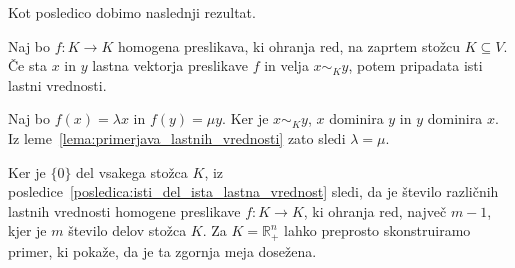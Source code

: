 \documentclass[mat2, tisk]{fmfdelo}
\newcommand{\R}{\mathbb{R}}
\begin{document}
Kot posledico dobimo naslednji rezultat.

\begin{posledica}\label{posledica:isti_del_ista_lastna_vrednost}
Naj bo $f\colon K\longrightarrow K$ homogena preslikava, ki ohranja red,
na zaprtem stožcu $K\subseteq V$. Če sta $x$ in $y$ lastna vektorja
preslikave $f$ in velja $x\sim_K y$, potem pripadata isti lastni
vrednosti.
\end{posledica}

\begin{dokaz}
Naj bo $f(x)=\lambda x$ in $f(y)=\mu y$. Ker je $x\sim_K y$, $x$
dominira $y$ in $y$ dominira $x$. Iz
leme~\ref{lema:primerjava_lastnih_vrednosti} zato sledi $\lambda=\mu$.
\end{dokaz}

Ker je $\{0\}$ del vsakega stožca $K$, iz posledice~\ref{posledica:isti_del_ista_lastna_vrednost} sledi, 
da je število različnih lastnih
vrednosti homogene preslikave $f\colon K\longrightarrow K$, ki ohranja
red, največ $m-1$, kjer je $m$ število delov stožca $K$. Za $K=\R_+^n$ lahko preprosto skonstruiramo primer, 
ki pokaže, da je ta zgornja meja dosežena.
\end{document}
